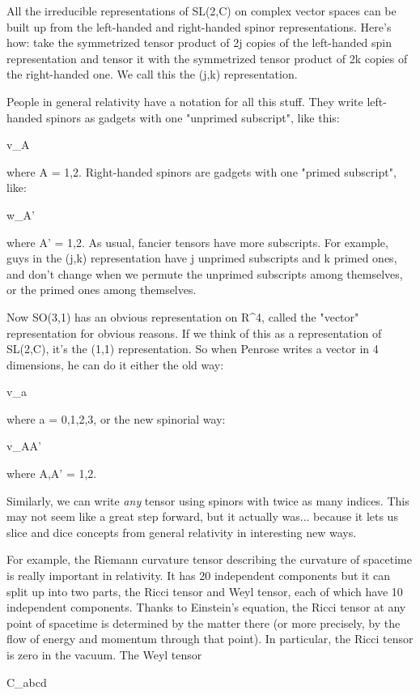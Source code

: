 All the irreducible representations of SL(2,C) on complex vector spaces
can be built up from the left-handed and right-handed spinor
representations.  Here's how: take the symmetrized tensor product
of 2j copies of the left-handed spin representation and tensor it with
the symmetrized tensor product of 2k copies of the right-handed one.
We call this the (j,k) representation.  

People in general relativity have a notation for all this stuff.  They
write left-handed spinors as gadgets with one "unprimed subscript", like
this:

v_{A}

where A = 1,2.  Right-handed spinors are gadgets with one "primed
subscript", like:

w_{A'}

where A' = 1,2.  As usual, fancier tensors have more subscripts.  
For example, guys in the (j,k) representation have j unprimed subscripts
and k primed ones, and don't change when we permute the unprimed
subscripts among themselves, or the primed ones among themselves.

Now SO(3,1) has an obvious representation on R^4, called the "vector"
representation for obvious reasons.  If we think of this as a
representation of SL(2,C), it's the (1,1) representation.  So when
Penrose writes a vector in 4 dimensions, he can do it either the old
way:

v_{a}

where a = 0,1,2,3, or the new spinorial way:

v_{AA'}

where A,A' = 1,2.  

Similarly, we can write \emph{any} tensor using spinors with twice as many
indices.  This may not seem like a great step forward, but it actually
was... because it lets us slice and dice concepts from general relativity
in interesting new ways.

For example, the Riemann curvature tensor describing the curvature of
spacetime is really important in relativity.  It has 20 independent
components but it can split up into two parts, the Ricci tensor and Weyl
tensor, each of which have 10 independent components.  Thanks to
Einstein's equation, the Ricci tensor at any point of spacetime is
determined by the matter there (or more precisely, by the flow of energy
and momentum through that point).  In particular, the Ricci tensor is
zero in the vacuum.  The Weyl tensor 

C_{abcd}

